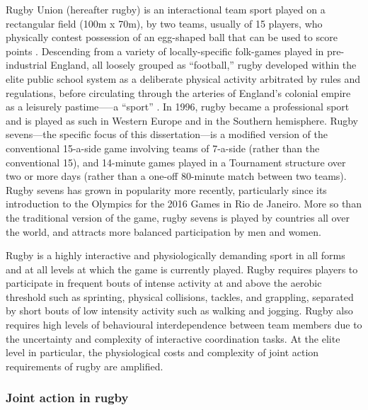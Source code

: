 Rugby Union (hereafter rugby) is an interactional team sport played on a rectangular field (100m x 70m), by two teams, usually of 15 players, who physically contest possession of an egg-shaped ball that can be used to score points \citep{IRB2014}.  Descending from a variety of locally-specific folk-games played in pre-industrial England, all loosely grouped as ``football,'' rugby developed within the elite public school system as a deliberate physical activity arbitrated by rules and regulations, before circulating through the arteries of England's colonial empire as a leisurely pastime—--a ``sport'' \citep{Dunning2005}.  In 1996, rugby became a professional sport and is played as such in Western Europe and in the Southern hemisphere. Rugby sevens---the specific focus of this dissertation---is a modified version of the conventional 15-a-side game involving teams of 7-a-side (rather than the conventional 15), and 14-minute games played in a Tournament structure over two or more days (rather than a one-off 80-minute match between two teams).  Rugby sevens has grown in popularity more recently, particularly since its introduction to the Olympics for the 2016 Games in Rio de Janeiro.  More so than the traditional version of the game, rugby sevens is played by countries all over the world, and attracts more balanced participation by men and women.

Rugby is a highly interactive and physiologically demanding sport in all forms and at all levels at which the game is currently played. Rugby requires players to participate in frequent bouts of intense activity at and above the aerobic threshold such as sprinting, physical collisions, tackles, and grappling, separated by short bouts of low intensity activity such as walking and jogging.  Rugby also requires high levels of behavioural interdependence between team members due to the uncertainty and complexity of interactive coordination tasks.  At the elite level in particular, the physiological costs and complexity of joint action requirements of rugby are amplified.


\subsubsection{Joint action in rugby}

